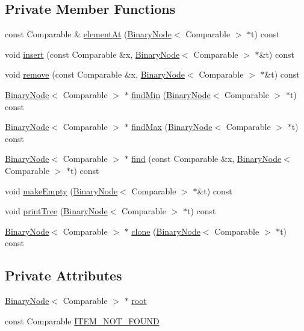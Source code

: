 \subsection*{Private Member Functions}
\begin{DoxyCompactItemize}
\item 
const Comparable \& \hyperlink{class_b_s_t_a7b020e9eb1dbcebd65f0de6803062607}{element\+At} (\hyperlink{class_binary_node}{Binary\+Node}$<$ Comparable $>$ $\ast$t) const 
\item 
void \hyperlink{class_b_s_t_a85378385a0c683af6942649367ceb1e3}{insert} (const Comparable \&x, \hyperlink{class_binary_node}{Binary\+Node}$<$ Comparable $>$ $\ast$\&t) const 
\item 
void \hyperlink{class_b_s_t_aa0adaeade5fd57945de437d0a36e345b}{remove} (const Comparable \&x, \hyperlink{class_binary_node}{Binary\+Node}$<$ Comparable $>$ $\ast$\&t) const 
\item 
\hyperlink{class_binary_node}{Binary\+Node}$<$ Comparable $>$ $\ast$ \hyperlink{class_b_s_t_afdd16dca1e021dd7c64de0f5732f8120}{find\+Min} (\hyperlink{class_binary_node}{Binary\+Node}$<$ Comparable $>$ $\ast$t) const 
\item 
\hyperlink{class_binary_node}{Binary\+Node}$<$ Comparable $>$ $\ast$ \hyperlink{class_b_s_t_acf08e1a540542b2c7a422616b6568e31}{find\+Max} (\hyperlink{class_binary_node}{Binary\+Node}$<$ Comparable $>$ $\ast$t) const 
\item 
\hyperlink{class_binary_node}{Binary\+Node}$<$ Comparable $>$ $\ast$ \hyperlink{class_b_s_t_a3c8ff3dde4d291cb5dd2dafa3c51e5d2}{find} (const Comparable \&x, \hyperlink{class_binary_node}{Binary\+Node}$<$ Comparable $>$ $\ast$t) const 
\item 
void \hyperlink{class_b_s_t_adf7cde06c85ed43f66ff88ccd263a648}{make\+Empty} (\hyperlink{class_binary_node}{Binary\+Node}$<$ Comparable $>$ $\ast$\&t) const 
\item 
void \hyperlink{class_b_s_t_ace2d68a869023df8700c42e6830a7e2c}{print\+Tree} (\hyperlink{class_binary_node}{Binary\+Node}$<$ Comparable $>$ $\ast$t) const 
\item 
\hyperlink{class_binary_node}{Binary\+Node}$<$ Comparable $>$ $\ast$ \hyperlink{class_b_s_t_ad1b7bb1aed2b00bb0341f5fe044b8e5b}{clone} (\hyperlink{class_binary_node}{Binary\+Node}$<$ Comparable $>$ $\ast$t) const 
\end{DoxyCompactItemize}
\subsection*{Private Attributes}
\begin{DoxyCompactItemize}
\item 
\hyperlink{class_binary_node}{Binary\+Node}$<$ Comparable $>$ $\ast$ \hyperlink{class_b_s_t_a48d08a19c48c0c260a7d5db37149ad0f}{root}
\item 
const Comparable \hyperlink{class_b_s_t_a93811f042c4201e993fe39638c15f251}{I\+T\+E\+M\+\_\+\+N\+O\+T\+\_\+\+F\+O\+U\+N\+D}
\end{DoxyCompactItemize}
